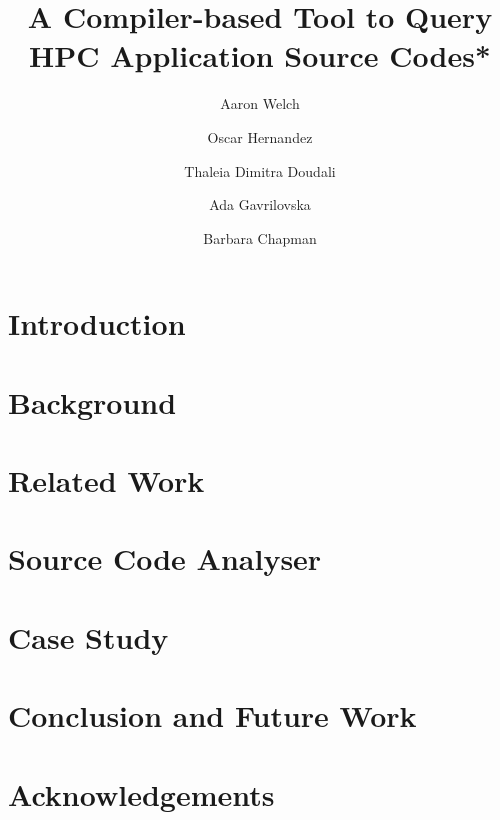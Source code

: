 \documentclass[letterpaper, 10 pt, conference]{ieeeconf}
\begin{document}
\title{\LARGE \bf
A Compiler-based Tool to Query HPC Application Source Codes*
}
\author[1, 2]{Aaron Welch}
\author[1]{}
\author[1]{Oscar Hernandez}
\author[3]{Thaleia Dimitra Doudali}
\author[3]{Ada Gavrilovska}
\author[2]{Barbara Chapman}

\maketitle
\begin{abstract}

\end{abstract}
\section{Introduction}
\label{sec:intro}

\section{Background}
\label{sec:background}

\section{Related Work}
\label{sec:related}

\section{Source Code Analyser}
\label{sec:analysis}

\section{Case Study}
\label{sec:casestudy}

\section{Conclusion and Future Work}
\label{sec:conclusion}

\section*{Acknowledgements}
\label{sec:ack}



\end{document}
